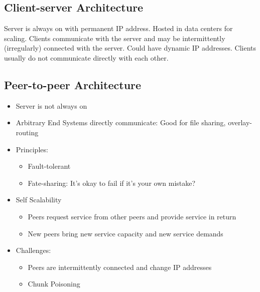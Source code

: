 \documentclass[a4paper]{article}
\begin{document}
\subsection{Client-server Architecture}
Server is always on with permanent IP address. Hosted in data centers for scaling. Clients communicate with the server and may be intermittently (irregularly) connected with the server. Could have dynamic IP addresses. Clients usually do not communicate directly with each other.

\subsection{Peer-to-peer Architecture}
\begin{itemize}
    \item Server is not always on
    \item Arbitrary End Systems directly communicate: Good for file sharing, overlay-routing
    \item Principles:
    \begin{itemize}[label=$\circ$]
        \item Fault-tolerant
        \item Fate-sharing: It's okay to fail if it's your own mistake?
    \end{itemize}
    \item Self Scalability
    \begin{itemize}[label=$\circ$]
        \item Peers request service from other peers and provide service in return
        \item New peers bring new service capacity and new service demands
    \end{itemize}
    \item Challenges:
    \begin{itemize}[label=$\circ$]
        \item Peers are intermittently connected and change IP addresses
        \item Chunk Poisoning
    \end{itemize}
\end{itemize}
\end{document}
